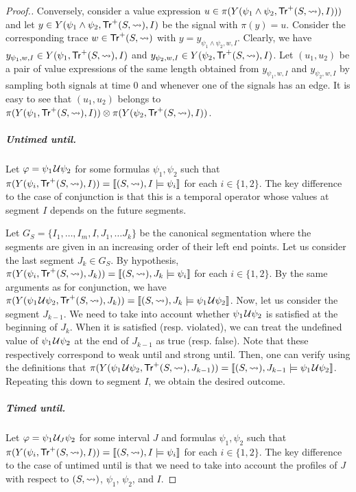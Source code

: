 \begin{proof}[\normalsize Proof.]
	Conversely, consider a value expression $u \in \pi(Y(\psi_1 \land \psi_2, \mathsf{Tr}^+(S,{\rightsquigarrow}), I)))$ and let $y \in Y(\psi_1 \land \psi_2, \mathsf{Tr}^+(S,{\rightsquigarrow}), I)$ be the signal with $\pi(y) = u$.
	Consider the corresponding trace $w \in \mathsf{Tr}^+(S,{\rightsquigarrow})$ with $y = y_{\psi_1 \land \psi_2, w, I}$.
	Clearly, we have $y_{\psi_1, w, I} \in Y(\psi_1, \mathsf{Tr}^+(S,{\rightsquigarrow}), I)$ and $y_{\psi_2, w, I} \in Y(\psi_2, \mathsf{Tr}^+(S,{\rightsquigarrow}), I)$.
	Let $(u_1,u_2)$ be a pair of value expressions of the same length obtained from $y_{\psi_1, w, I}$ and $y_{\psi_2, w, I}$ by sampling both signals at time 0 and whenever one of the signals has an edge.
	It is easy to see that $(u_1,u_2)$ belongs to $\pi(Y(\psi_1, \mathsf{Tr}^+(S,{\rightsquigarrow}), I)) \otimes \pi(Y(\psi_2, \mathsf{Tr}^+(S,{\rightsquigarrow}), I))$.
	
	\subparagraph*{Untimed until.}
	Let $\varphi = \psi_1 \kern.1em\mathcal{U} \psi_2$ for some formulas $\psi_1, \psi_2$ such that $\pi(Y(\psi_i, \mathsf{Tr}^+(S,{\rightsquigarrow}), I)) = \llbracket (S,{\rightsquigarrow}), I \models \psi_i \rrbracket$ for each $i \in \{1,2\}$.
	The key difference to the case of conjunction is that this is a temporal operator whose values at segment $I$ depends on the future segments.
	
	Let $G_S = \{ I_1, \ldots, I_m, I, J_1, \ldots J_k \}$ be the canonical segmentation where the segments are given in an increasing order of their left end points.
	Let us consider the last segment $J_k \in G_S$.
	By hypothesis, $\pi(Y(\psi_i, \mathsf{Tr}^+(S,{\rightsquigarrow}), J_k)) = \llbracket (S,{\rightsquigarrow}), J_k \models \psi_i \rrbracket$ for each $i \in \{1,2\}$.
	By the same arguments as for conjunction, we have $\pi(Y(\psi_1 \kern.1em\mathcal{U} \psi_2, \mathsf{Tr}^+(S,{\rightsquigarrow}), J_k)) = \llbracket (S,{\rightsquigarrow}), J_k \models \psi_1 \kern.1em\mathcal{U} \psi_2 \rrbracket$.
	Now, let us consider the segment $J_{k-1}$.
	We need to take into account whether $\psi_1 \kern.1em\mathcal{U} \psi_2$ is satisfied at the beginning of $J_k$.
	When it is satisfied (resp. violated), we can treat the undefined value of $\psi_1 \kern.1em\mathcal{U} \psi_2$ at the end of $J_{k-1}$ as true (resp. false).
	Note that these respectively correspond to weak until and strong until.
	Then, one can verify using the definitions that $\pi(Y(\psi_1 \kern.1em\mathcal{U} \psi_2, \mathsf{Tr}^+(S,{\rightsquigarrow}), J_{k-1})) = \llbracket (S,{\rightsquigarrow}), J_{k-1} \models \psi_1 \kern.1em\mathcal{U} \psi_2 \rrbracket$.
	Repeating this down to segment $I$, we obtain the desired outcome.
	
	\subparagraph*{Timed until.}
	Let $\varphi = \psi_1 \kern.1em\mathcal{U}_J \psi_2$ for some interval $J$ and formulas $\psi_1, \psi_2$ such that $\pi(Y(\psi_i, \mathsf{Tr}^+(S,{\rightsquigarrow}), I)) = \llbracket (S,{\rightsquigarrow}), I \models \psi_i \rrbracket$ for each $i \in \{1,2\}$.
	The key difference to the case of untimed until is that we need to take into account the profiles of $J$ with respect to $(S,{\rightsquigarrow})$, $\psi_1$, $\psi_2$, and $I$.
	

\end{proof}

